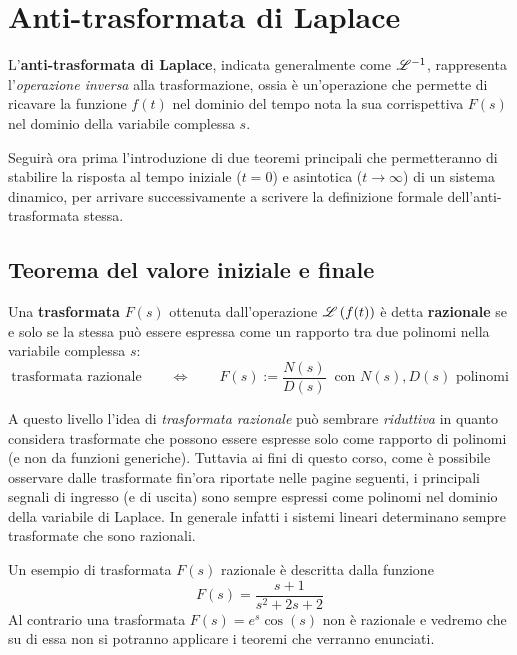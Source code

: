 		
\section{Anti-trasformata di Laplace}
	L'\textbf{anti-trasformata di Laplace}, indicata generalmente come $\mathscr {L}^{-1}$, rappresenta l'\textit{operazione inversa} alla trasformazione, ossia è un'operazione che permette di ricavare la funzione $f(t)$ nel dominio del tempo nota la sua corrispettiva $F(s)$ nel dominio della variabile complessa $s$.
	
	Seguirà ora prima l'introduzione di due teoremi principali che permetteranno di stabilire la risposta al tempo iniziale ($t=0$) e asintotica ($t\rightarrow \infty$) di un sistema dinamico, per arrivare successivamente a scrivere la definizione formale dell'anti-trasformata stessa.
	
	\subsection{Teorema del valore iniziale e finale}
		
		\begin{concetto}
			Una \textbf{trasformata} $F(s)$ ottenuta dall'operazione $\mathscr L \left( f(t) \right)$ è detta \textbf{razionale} se e solo se la stessa può essere espressa come un rapporto tra due polinomi nella variabile complessa $s$:
			\[ \textrm{trasformata razionale} \qquad \Leftrightarrow \qquad F(s) := \frac{N(s)}{D(s)} \ \textrm{ con $N(s), D(s)$ polinomi}  \]			
		\end{concetto}
		\begin{nota}
			A questo livello l'idea di \textit{trasformata razionale} può sembrare \textit{riduttiva} in quanto considera trasformate che possono essere espresse solo come rapporto di polinomi (e non da funzioni generiche). Tuttavia ai fini di questo corso, come è possibile osservare dalle trasformate fin'ora riportate nelle pagine seguenti, i principali segnali di ingresso (e di uscita) sono sempre espressi come polinomi nel dominio della variabile di Laplace. In generale infatti i sistemi lineari determinano sempre trasformate che sono razionali.
		\end{nota}
		\begin{esempio}
			Un esempio di trasformata $F(s)$ razionale è descritta dalla funzione
			\[ F(s) = \frac{s+1}{s^2 + 2s + 2}\]
			Al contrario una trasformata $F(s) = e^s \cos(s)$ non è razionale e vedremo che su di essa non si potranno applicare i teoremi che verranno enunciati.
		\end{esempio}
		
